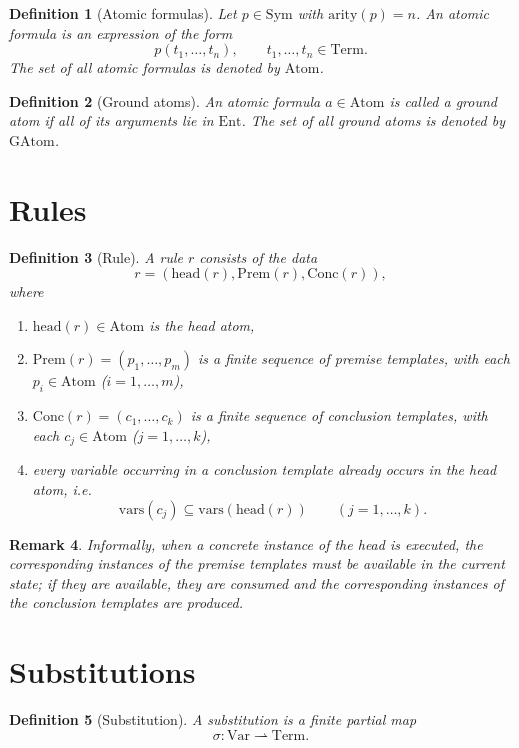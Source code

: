 \documentclass[11pt]{article}
\newtheorem{definition}{Definition}[section]
\newtheorem{remark}[definition]{Remark}
\newcommand{\Ent}{\mathrm{Ent}}
\newcommand{\Var}{\mathrm{Var}}
\newcommand{\Sym}{\mathrm{Sym}}
\newcommand{\Term}{\mathrm{Term}}
\newcommand{\Atom}{\mathrm{Atom}}
\newcommand{\GAtom}{\mathrm{GAtom}}
\newcommand{\arity}{\mathrm{arity}}
\newcommand{\headsym}{\mathrm{head}}
\newcommand{\Prem}{\mathrm{Prem}}
\newcommand{\Conc}{\mathrm{Conc}}
\newcommand{\vars}{\mathrm{vars}}
\begin{document}
\begin{definition}[Atomic formulas]
Let $p \in \Sym$ with $\arity(p)=n$. An \emph{atomic formula} is an expression of the form
\[
p(t_1,\dots,t_n),
\qquad t_1,\dots,t_n \in \Term.
\]
The set of all atomic formulas is denoted by $\Atom$.
\end{definition}

\begin{definition}[Ground atoms]
An atomic formula $a \in \Atom$ is called a \emph{ground atom} if all of its arguments lie in $\Ent$.
The set of all ground atoms is denoted by $\GAtom$.
\end{definition}

\section{Rules}

\begin{definition}[Rule]
A rule $r$ consists of the data
\[
r = (\headsym(r), \Prem(r), \Conc(r)),
\]
where
\begin{enumerate}[label=\arabic*.]
\item $\headsym(r) \in \Atom$ is the head atom,
\item $\Prem(r) = (p_1,\dots,p_m)$ is a finite sequence of premise templates, with each $p_i \in \Atom$ ($i=1,\dots,m$),
\item $\Conc(r) = (c_1,\dots,c_k)$ is a finite sequence of conclusion templates, with each $c_j \in \Atom$ ($j=1,\dots,k$),
\item every variable occurring in a conclusion template already occurs in the head atom, i.e.
\[
\vars(c_j) \subseteq \vars(\headsym(r)) \qquad (j=1,\dots,k).
\]
\end{enumerate}
\end{definition}

\begin{remark}
Informally, when a concrete instance of the head is executed, the corresponding instances of the premise templates must be available in the current state; if they are available, they are consumed and the corresponding instances of the conclusion templates are produced.
\end{remark}

\section{Substitutions}

\begin{definition}[Substitution]
A substitution is a finite partial map
\[
\sigma : \Var \rightharpoonup \Term.
\]
\end{definition}
\end{document}
